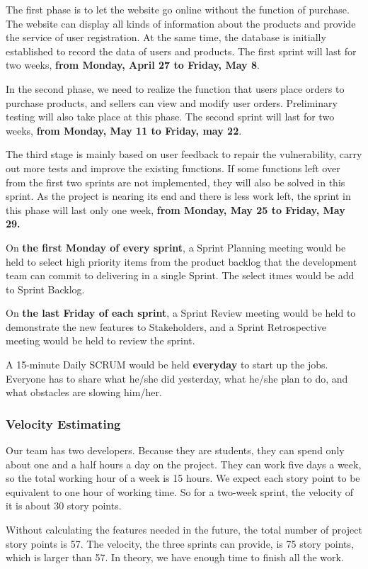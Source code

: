 \documentclass{report}
\begin{document}
The first phase is to let the website go online without the function of purchase. The website can display all kinds of information about the products and provide the service of user registration. At the same time, the database is initially established to record the data of users and products. The first sprint will last for two weeks, \textbf{from Monday, April 27 to Friday, May 8}. 


In the second phase, we need to realize the function that users place orders to purchase products, and sellers can view and modify user orders. Preliminary testing will also take place at this phase. The second sprint will last for two weeks, \textbf{from Monday, May 11 to Friday, may 22}.

The third stage is mainly based on user feedback to repair the vulnerability, carry out more tests and improve the existing functions. If some functions left over from the first two sprints are not implemented, they will also be solved in this sprint. As the project is nearing its end and there is less work left, the sprint in this phase will last only one week, \textbf{from Monday, May 25 to Friday, May 29.}

On \textbf{the first Monday of every sprint}, a Sprint Planning meeting would be held to select high priority items from the product backlog that the development team can commit to delivering in a single Sprint. The select itmes would be add to Sprint Backlog.

On \textbf{the last Friday of each sprint}, a Sprint Review meeting would be held to demonstrate the new features to Stakeholders, and a Sprint Retrospective meeting would be held to review the sprint.

A 15-minute Daily SCRUM would be held \textbf{everyday} to start up the jobs. Everyone has to share what he/she did yesterday, what he/she plan to do, and what obstacles are slowing him/her.


\subsubsection{Velocity Estimating}
Our team has two developers. Because they are students, they can spend only about one and a half hours a day on the project. They can work five days a week, so the total working hour of a week is 15 hours. We expect each story point to be equivalent to one hour of working time. So for a two-week sprint, the velocity of it is about 30 story points. 

Without calculating the features needed in the future, the total number of project story points is 57. The velocity, the three sprints can provide, is 75 story points, which is larger than 57. In theory, we have enough time to finish all the work.
\end{document}
